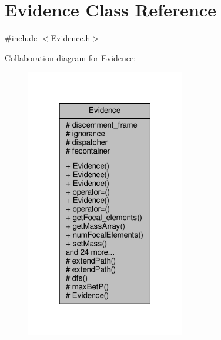 \hypertarget{classEvidence}{}\section{Evidence Class Reference}
\label{classEvidence}


{\ttfamily \#include $<$Evidence.\+h$>$}



Collaboration diagram for Evidence\+:\nopagebreak
\begin{figure}[H]
\begin{center}
\leavevmode
\includegraphics[width=196pt]{classEvidence__coll__graph}
\end{center}
\end{figure}
